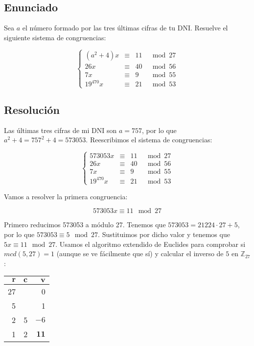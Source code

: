 \section{}\label{ej-1-2}

\subsection*{Enunciado}

Sea $a$ el número formado por las tres últimas cifras de tu DNI\@.
Resuelve el siguiente sistema de congruencias:

\[
\left\{
\begin{array}{rcrl}
	(a^2 +4)x & \equiv & 11 & \mod 27 \\
	26x       & \equiv & 40 & \mod 56 \\
	7x        & \equiv & 9  & \mod 55 \\
	19^{470}x & \equiv & 21 & \mod 53
\end{array}
\right.
\]

\subsection*{Resolución}

Las últimas tres cifras de mi DNI son $a=757$, por lo que $a^2 + 4 = 757^2 + 4 = 573053$.
Reescribimos el sistema de congruencias:

\[
\left\{
\begin{array}{rcrl}
	573053x   & \equiv & 11 & \mod 27 \\
	26x       & \equiv & 40 & \mod 56 \\
	7x        & \equiv & 9  & \mod 55 \\
	19^{470}x & \equiv & 21 & \mod 53
\end{array}
\right.
\]

Vamos a resolver la primera congruencia:

\[573053x \equiv 11 \mod 27\]

Primero reducimos 573053 a módulo 27.
Tenemos que $573053 = 21224 \cdot 27 + 5$, por lo que $573053 \equiv 5 \mod 27$.
Sustituimos por dicho valor y tenemos que $5x \equiv 11 \mod 27$.
Usamos el algoritmo extendido de Euclides para comprobar si $mcd(5,27) = 1$ (aunque se ve fácilmente que sí) y calcular el inverso de $5$ en $\mathbb{Z}_{27}$:

\begin{center}
\begin{tabular}{r r r}
	$\boldsymbol{r}$ & $\boldsymbol{c}$ & $\boldsymbol{v}$  \\
	\toprule
	27               &                  & 0                 \\
	5                &                  & 1                 \\
	2                & 5                & $-6$              \\
	1                & 2                & $\boldsymbol{11}$ \\
\end{tabular}
\end{center}

